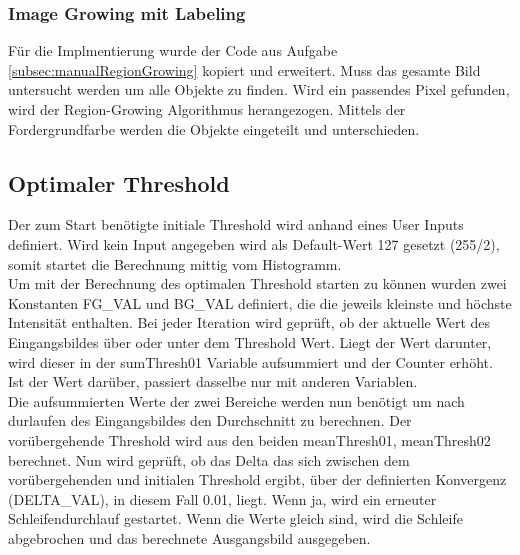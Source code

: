 \documentclass[12pt,german]{article}
\begin{document}
\begin{landscape}

\end{landscape}


\subsubsection{Image Growing mit Labeling}
Für die Implmentierung wurde der Code aus Aufgabe \ref{subsec:manualRegionGrowing} kopiert und erweitert. Muss das gesamte Bild untersucht werden um alle Objekte zu finden. Wird ein passendes Pixel gefunden, wird der Region-Growing Algorithmus herangezogen. Mittels der Fordergrundfarbe werden die Objekte eingeteilt und unterschieden.

\begin{landscape}

\end{landscape}


\subsection{Optimaler Threshold}
Der zum Start benötigte initiale Threshold wird anhand eines User Inputs definiert. Wird kein Input angegeben wird als Default-Wert 127 gesetzt (255/2), somit startet die Berechnung mittig vom Histogramm.\\
Um mit der Berechnung des optimalen Threshold starten zu können wurden zwei Konstanten FG\_VAL und BG\_VAL definiert, die die jeweils kleinste und höchste Intensität enthalten.  Bei jeder Iteration wird geprüft, ob der aktuelle Wert des Eingangsbildes über oder unter dem Threshold Wert. Liegt der Wert darunter, wird dieser in der sumThresh01 Variable aufsummiert und der Counter erhöht. Ist der Wert darüber, passiert dasselbe nur mit anderen Variablen.\\
Die aufsummierten Werte der zwei Bereiche werden nun benötigt um nach durlaufen des Eingangsbildes den Durchschnitt zu berechnen. Der vorübergehende Threshold wird aus den beiden meanThresh01, meanThresh02 berechnet. Nun wird geprüft, ob das Delta das sich zwischen dem vorübergehenden und initialen Threshold ergibt, über der definierten Konvergenz (DELTA\_VAL), in diesem Fall 0.01, liegt. Wenn ja, wird ein erneuter Schleifendurchlauf gestartet. Wenn die Werte gleich sind, wird die Schleife abgebrochen und das berechnete Ausgangsbild ausgegeben.
\end{document}
